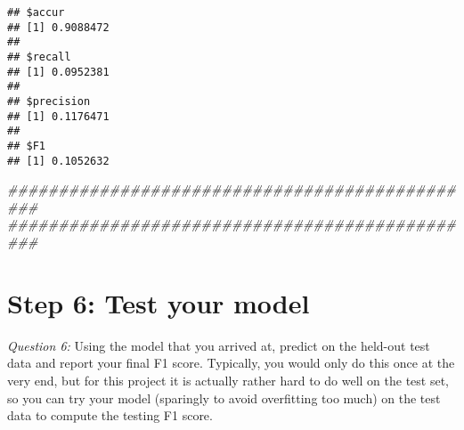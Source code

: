 \documentclass[
]{article}
\newenvironment{Shaded}{\begin{snugshade}}{\end{snugshade}}
\newcommand{\CommentTok}[1]{\textcolor[rgb]{0.56,0.35,0.01}{\textit{#1}}}
\begin{document}
\begin{verbatim}
## $accur
## [1] 0.9088472
## 
## $recall
## [1] 0.0952381
## 
## $precision
## [1] 0.1176471
## 
## $F1
## [1] 0.1052632
\end{verbatim}

\begin{Shaded}
\begin{Highlighting}[]
\CommentTok{###############################################}
\CommentTok{###############################################}
\end{Highlighting}
\end{Shaded}

\hypertarget{step-6-test-your-model}{%
\section{Step 6: Test your model}\label{step-6-test-your-model}}

\emph{Question 6:} Using the model that you arrived at, predict on the
held-out test data and report your final F1 score. Typically, you would
only do this once at the very end, but for this project it is actually
rather hard to do well on the test set, so you can try your model
(sparingly to avoid overfitting too much) on the test data to compute
the testing F1 score.
\end{document}
